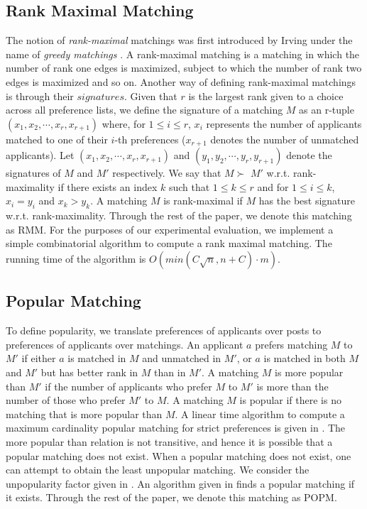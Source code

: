 \documentclass[letterpaper]{article} %
\begin{document}
\subsection{Rank Maximal Matching}
The notion of \textit{rank-maximal} matchings was first introduced by
Irving under the name of \textit{greedy matchings} \cite{irving2003greedy}.
A rank-maximal matching is a matching in which the number of rank one edges is maximized, subject to which the number of rank two edges is maximized and so on.
Another way of defining rank-maximal matchings is through their $signatures$.
Given that $r$ is the largest rank given to a choice across all preference lists, we define the signature of a matching $M$ as an
 r-tuple $(x_{1},x_{2},\cdots ,x_{r}, x_{r+1})$ where, for $1 \leq i \leq r$, $x_{i}$ represents the number of applicants matched
to one of their $i$-th preferences ($x_{r+1}$ denotes the number of unmatched applicants). Let $(x_1, x_2,\cdots, x_r, x_{r+1})$ and $(y_1, y_2,\cdots, y_r, y_{r+1})$ denote
the signatures of $M$ and $M'$ respectively. We say that $M \succ$ $M'$ w.r.t. rank-maximality if there exists an index $k$ such that
 $1 \le k \le r$ and
for $1 \le i \le k$, $x_i = y_i$ and $x_k > y_k$. A matching $M$ is rank-maximal if $M$ has the best signature
w.r.t. rank-maximality. %
Through the rest of the paper, we denote this matching as RMM.
For the purposes of our experimental evaluation, we implement a simple combinatorial algorithm \cite{irving2004rank} to compute
a rank maximal matching. The running time of the algorithm is  $O(min(C\sqrt{n}, n+C)\cdot m)$. %
\subsection{Popular Matching}
To define popularity, we translate preferences of applicants over posts to preferences of applicants over matchings.
An applicant $a$ prefers matching $M$ to $M'$ if either $a$ is matched in $M$ and unmatched in $M'$, or $a$ is matched in both $M$ and $M'$ but has better rank in $M$ than in $M'$. A matching $M$ is more popular than $M'$ if the number of applicants
who prefer $M$ to $M'$ is more than the number of those who prefer $M'$ to $M$. A matching $M$ is popular if there is no matching that is more popular than $M$.
A linear time  algorithm to compute a maximum cardinality popular matching for strict preferences is given in \cite{pop-main}.
The more popular than relation is not transitive, and hence it is possible that a popular matching does not exist.  When a popular matching does not exist, one can attempt to obtain the  least unpopular matching. We consider the unpopularity factor given in \cite{unpop}.
An algorithm given in \cite{pop-bounded} finds a popular matching if it exists. %
Through the rest of the paper, we denote this matching as POPM.
\end{document}
